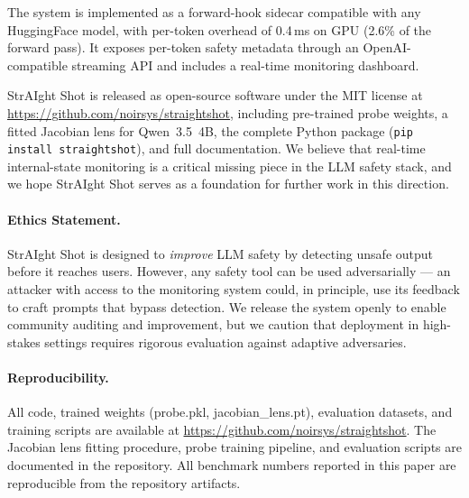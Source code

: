\documentclass[11pt]{article}
\begin{document}
The system is implemented as a forward-hook sidecar compatible with any HuggingFace model, with per-token overhead of 0.4\,ms on GPU (2.6\% of the forward pass). It exposes per-token safety metadata through an OpenAI-compatible streaming API and includes a real-time monitoring dashboard.

StrAIght Shot is released as open-source software under the MIT license at \url{https://github.com/noirsys/straightshot}, including pre-trained probe weights, a fitted Jacobian lens for Qwen~3.5~4B, the complete Python package (\texttt{pip install straightshot}), and full documentation. We believe that real-time internal-state monitoring is a critical missing piece in the LLM safety stack, and we hope StrAIght Shot serves as a foundation for further work in this direction.

\paragraph{Ethics Statement.}
StrAIght Shot is designed to \textit{improve} LLM safety by detecting unsafe output before it reaches users. However, any safety tool can be used adversarially — an attacker with access to the monitoring system could, in principle, use its feedback to craft prompts that bypass detection. We release the system openly to enable community auditing and improvement, but we caution that deployment in high-stakes settings requires rigorous evaluation against adaptive adversaries.

\paragraph{Reproducibility.}
All code, trained weights (probe.pkl, jacobian\_lens.pt), evaluation datasets, and training scripts are available at \url{https://github.com/noirsys/straightshot}. The Jacobian lens fitting procedure, probe training pipeline, and evaluation scripts are documented in the repository. All benchmark numbers reported in this paper are reproducible from the repository artifacts.

\end{document}
